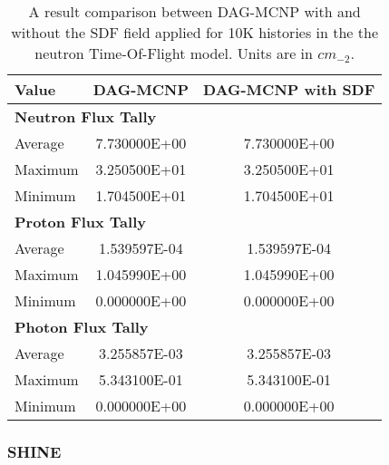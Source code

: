 \begin{table}
  \small
  \begin{center}
    \begin{tabular}{lcc}
          \toprule
          Value   & DAG-MCNP     & DAG-MCNP with SDF      \\
          \toprule
          \multicolumn{3}{l}{\textbf{Neutron Flux Tally}} \\
          Average & 7.730000E+00 & 7.730000E+00           \\
          Maximum & 3.250500E+01 & 3.250500E+01           \\
          Minimum & 1.704500E+01 & 1.704500E+01           \\
          \multicolumn{3}{l}{\textbf{Proton Flux Tally}}  \\
          Average & 1.539597E-04 & 1.539597E-04           \\
          Maximum & 1.045990E+00 & 1.045990E+00           \\
          Minimum & 0.000000E+00 & 0.000000E+00           \\
          \multicolumn{3}{l}{\textbf{Photon Flux Tally}}  \\
          Average & 3.255857E-03 & 3.255857E-03           \\
          Maximum & 5.343100E-01 & 5.343100E-01           \\
          Minimum & 0.000000E+00 & 0.000000E+00           \\
          \bottomrule
    \end{tabular}
  \end{center}
  \caption[Results of flux mesh tallies for several particle types in the nTOF
    model.]{A result comparison between DAG-MCNP with and without the SDF field
    applied for 10K histories in the the neutron Time-Of-Flight model. Units are
    in $cm_{-2}$.}
\end{table}

\subsubsection{SHINE}


